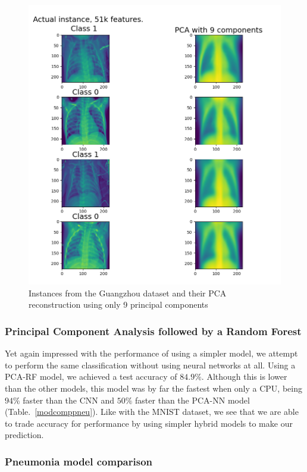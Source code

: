 \documentclass[onecolumn,10pt,cleanfoot]{asme2ej}
\begin{document}
\begin{figure}[H]
\centerline{\includegraphics[width=6in]{figure/pneupcacomp.png}}
\caption{Instances from the Guangzhou dataset and their PCA reconstruction using only 9 principal components}
\label{pneupcacomp}
\end{figure}

\subsubsection{Principal Component Analysis followed by a Random Forest}

Yet again impressed with the performance of using a simpler model, we attempt to perform the same classification without using neural networks at all. Using a PCA-RF model, we achieved a test accuracy of $84.9\%$. Although this is lower than the other models, this model was by far the fastest when only a CPU, being $94\%$ faster than the CNN and $50\%$ faster than the PCA-NN model (Table.~\ref{modcomppneu}). Like with the MNIST dataset, we see that we are able to trade accuracy for performance by using simpler hybrid models to make our prediction.

\subsubsection{Pneumonia model comparison}
\end{document}
